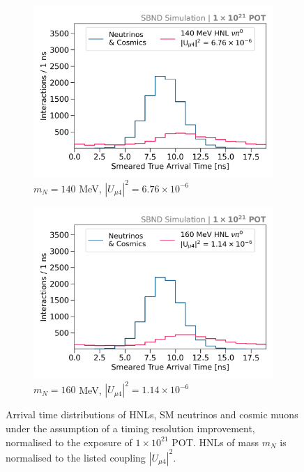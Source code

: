 \begin{figure}[htbp!]
        \begin{subfigure}[b]{0.495\textwidth}
            \includegraphics[width=\textwidth]{m140}
            \caption{$m_N = 140$ MeV, $|U_{\mu4}|^2 = 6.76 \times 10^{-6}$ }
        \end{subfigure}
        \begin{subfigure}[b]{0.495\textwidth}
            \includegraphics[width=\textwidth]{m160}
            \caption{$m_N = 160$ MeV, $|U_{\mu4}|^2 = 1.14 \times 10^{-6}$ }
        \end{subfigure}
        \caption[Smeared True Arrival Time Distributions in the Mass Range 140 - 160 MeV]{
	Arrival time distributions of HNLs, SM neutrinos and cosmic muons under the assumption of a timing resolution improvement, normalised to the exposure of $1 \times 10^{21}$ POT.
	HNLs of mass $m_N$ is normalised to the listed coupling $|U_{\mu4}|^2$.
	}
\end{figure}

